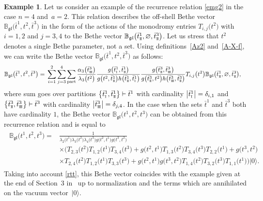 \documentclass[pdftex]{sigma}
\newcommand{\so}{\scriptscriptstyle \rm I}
\newcommand{\st}{\scriptscriptstyle \rm I\hspace{-1pt}I}
\newcommand{\sth}{\scriptscriptstyle \rm I\hspace{-1pt}I\hspace{-1pt}I}
\newcommand{\bt}{{\bar t}}
\theoremstyle{definition}
\newtheorem{exam}[thm]{Example}
\def\r#1{\eqref{#1}}
\def\rvec{|0\rangle}
\def\BBg{\mathbb{B}_{\mathfrak{gl}}}
\begin{document}
\begin{exam}\label{Exam31}
Let us consider an example of the recurrence relation \r{emg2} in the
case ${n=4}$ and~${a=2}$. This relation describes the off-shell Bethe vector
$\BBg\bigl(\bt^1,t^2,\bt^3\bigr)$ in the form of the actions of the monodromy
entries $T_{i,j}\bigl(t^2\bigr)$ with $i=1,2$ and $j=3,4$ to the Bethe vector $\BBg\bigl(\bt^1_{\st},\varnothing,\bt^3_{\st}\bigr)$. Let us stress that $t^2$ denotes a single Bethe parameter, not a set.
Using definitions~\r{Az2}
and~\r{A-X-f}, we can write the Bethe vector $\BBg\bigl(\bt^1,t^2,\bt^3\bigr)$
as follows:
\begin{align*}
\BBg\bigl(\bt^1,t^2,\bt^3\bigr)={}&\sum_{i=1}^2\sum_{j=3}^4\sum_{\rm part}
\frac{\alpha_3\bigl(\bt^3_{\sth}\bigr)}{\lambda_3\bigl(t^2\bigr)}
\frac{g\bigl(\bt^1_{\so},\bt^1_{\st}\bigr)}{g\bigl(t^2,\bt^1_{\st}\bigr) h\bigl(\bt^1_{\st},\bt^1_{\so}\bigr)}
\frac{g\bigl(\bt^3_{\st},\bt^3_{\sth}\bigr)}{g\bigl(\bt^3_{\st},t^2\bigr) h\bigl(\bt^3_{\sth},\bt^3_{\st}\bigr)}
 T_{i,j}\bigl(t^2\bigr)\BBg\bigl(\bt^1_{\st},\varnothing,\bt^3_{\st}\bigr) ,
\end{align*}
where sum goes over partitions $\bigl\{\bt^1_{\so},\bt^1_{\st}\bigr\}\vdash\bt^1$
with cardinality $\big|\bt^1_{\so}\big|=\delta_{i,1}$ and
$\bigl\{\bt^3_{\st},\bt^3_{\sth}\bigr\}\vdash\bt^3$
with cardinality $\big|\bt^3_{\sth}\big|=\delta_{j,4}$. In the case when the sets
$\bt^1$ and $\bt^3$ both have cardinality $1$, the Bethe vector
$\BBg\bigl(t^1,t^2,t^3\bigr)$ can be obtained from this recurrence relation and is equal to
\begin{align*}
\begin{split}
\BBg\bigl(t^1,t^2,t^3\bigr)={}&\frac{1}{\lambda_2\bigl(t^1\bigr) \lambda_3\bigl(t^2\bigr) \lambda_4\bigl(t^3\bigr)
g\bigl(t^2,t^1\bigr) g\bigl(t^3,t^2\bigr)}\\
&\times\bigl(T_{2,3}\bigl(t^2\bigr) T_{1,2}\bigl(t^1\bigr) T_{3,4}\bigl(t^3\bigr)+
g\bigl(t^2,t^1\bigr) T_{1,3}\bigl(t^2\bigr) T_{3,4}\bigl(t^3\bigr) T_{2,2}\bigl(t^1\bigr)+
g\bigl(t^3,t^2\bigr)\\
&\times T_{2,4}\bigl(t^2\bigr) T_{1,2}\bigl(t^1\bigr) T_{3,3}\bigl(t^3\bigr)+
g\bigl(t^2,t^1\bigr) g\bigl(t^3,t^2\bigr) T_{1,4}\bigl(t^2\bigr) T_{3,2}\bigl(t^3\bigr) T_{1,1}\bigl(t^1\bigr)\bigr)\rvec .
\end{split}
\end{align*}
Taking into account \r{rtt}, this Bethe vector coincides with the example given at the end of Section~3 in~\cite{KT1} up to normalization and the terms which are annihilated on the vacuum vector~$\rvec$.
\end{exam}
\end{document}
